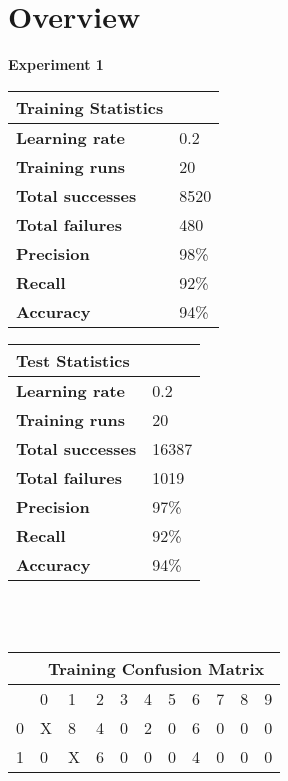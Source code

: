 \documentclass[titlepage,11pt]{article}
\begin{document}
\section[2]{Overview} {
    \textbf{Experiment 1}\\
        \begin{tabular}{l|l}
        \textbf{Training Statistics}&\\
        \hline
        \textbf{Learning rate}&         0.2\\
        \textbf{Training runs}&         20\\
        \textbf{Total successes}&       8520\\
        \textbf{Total failures}&        480\\
        \textbf{Precision}&             98\%\\
        \textbf{Recall}&                92\%\\
        \textbf{Accuracy}&              94\%\\
        \end{tabular}
        \hspace{5pt}
        \begin{tabular}{l|l}
        \textbf{Test Statistics}&\\
        \hline
        \textbf{Learning rate}&         0.2\\
        \textbf{Training runs}&         20\\
        \textbf{Total successes}&       16387\\
        \textbf{Total failures}&        1019\\
        \textbf{Precision}&             97\%\\
        \textbf{Recall}&                92\%\\
        \textbf{Accuracy}&              94\%\\
        \end{tabular}\\
        \vspace{2pt}\\
        \begin{tabular}{|l|llllllllll|}
        \hline
        &\multicolumn{10}{c|}{\textbf{Training Confusion Matrix}}\\
        \hline
        &     0&   1&   2&   3&   4&   5&   6&   7&   8&   9\\
        \hline
        0&    X&   8&   4&   0&   2&   0&   6&   0&   0&   0\\
        1&    0&   X&   6&   0&   0&   0&   4&   0&   0&   0\\

\end{tabular}}
\end{document}
